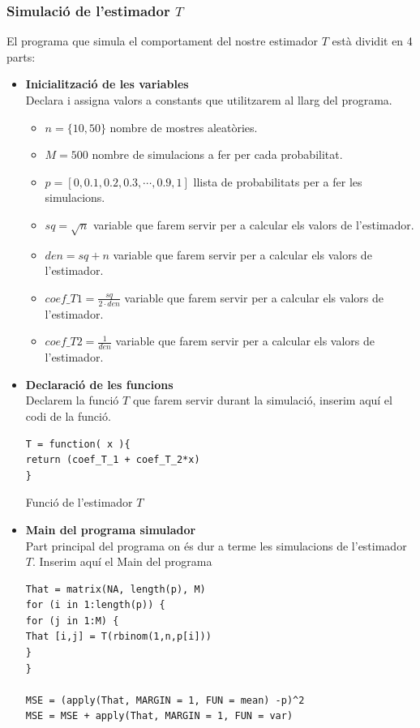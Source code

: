 \documentclass[12pt]{article}
\begin{document}
\subsubsection{Simulació de l'estimador $T$}
El programa que simula el comportament del nostre estimador $T$ està dividit en 4 parts:
\begin{itemize}
\item \textbf{Inicialització de les variables}\\
Declara i assigna valors a constants que utilitzarem al llarg del programa.
\begin{itemize}
\item[\rightarrow] $n=\{10,50\}$ nombre de mostres aleatòries.
\item[\rightarrow] $M=500$ nombre de simulacions a fer per cada probabilitat.
\item[\rightarrow] $p=[0,0.1,0.2,0.3,\cdots,0.9,1]$ llista de probabilitats per a fer les simulacions.
\item[\rightarrow] $sq=\sqrt{n}$ variable que farem servir per a calcular els valors de l'estimador.
\item[\rightarrow] $den=sq+n$ variable que farem servir per a calcular els valors de l'estimador.
\item[\rightarrow] $coef\_T1=\frac{sq}{2\cdot den}$ variable que farem servir per a calcular els valors de l'estimador.
\item[\rightarrow] $coef\_T2=\frac{1}{den}$ variable que farem servir per a calcular els valors de l'estimador.
\end{itemize}
\item \textbf{Declaració de les funcions}\\
Declarem la funció $T$ que farem servir durant la simulació,
inserim aquí el codi de la funció.
\begin{center}
\begin{verbatim}
T = function( x ){
return (coef_T_1 + coef_T_2*x)
}
\end{verbatim}
Funció de l'estimador $T$
\end{center}
\newpage
\item \textbf{Main del programa simulador}\\
Part principal del programa on és dur a terme les simulacions de l'estimador $T$. Inserim aquí el Main del programa
\begin{verbatim}
That = matrix(NA, length(p), M)
for (i in 1:length(p)) {
for (j in 1:M) {
That [i,j] = T(rbinom(1,n,p[i]))
}
}

MSE = (apply(That, MARGIN = 1, FUN = mean) -p)^2
MSE = MSE + apply(That, MARGIN = 1, FUN = var)


\end{verbatim}
\end{itemize}
\end{document}
